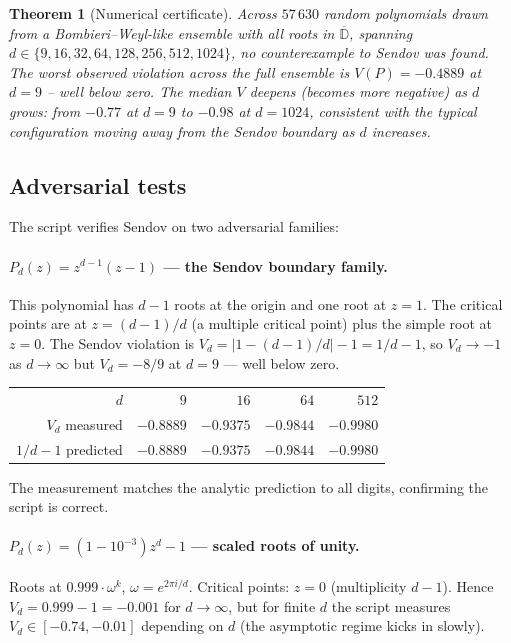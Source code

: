 \documentclass[11pt,a4paper]{article}
\newtheorem{theorem}{Theorem}[section]
\begin{document}
\begin{theorem}[Numerical certificate]\label{thm:scan}
Across $57\,630$ random polynomials drawn from a Bombieri--Weyl-like ensemble with all roots in $\overline{\mathbb D}$, spanning $d \in \{9, 16, 32, 64, 128, 256, 512, 1024\}$, no counterexample to Sendov was found. The worst observed violation across the full ensemble is $V(P) = -0.4889$ at $d = 9$ -- well below zero. The median $V$ \emph{deepens} (becomes more negative) as $d$ grows: from $-0.77$ at $d = 9$ to $-0.98$ at $d = 1024$, consistent with the typical configuration moving \emph{away} from the Sendov boundary as $d$ increases.
\end{theorem}

\subsection{Adversarial tests}

The script verifies Sendov on two adversarial families:

\paragraph{$P_d(z) = z^{d-1}(z - 1)$ — the Sendov boundary family.}
This polynomial has $d - 1$ roots at the origin and one root at $z = 1$. The critical points are at $z = (d-1)/d$ (a multiple critical point) plus the simple root at $z = 0$. The Sendov violation is
$V_d = |1 - (d-1)/d| - 1 = 1/d - 1$, so $V_d \to -1$ as $d \to \infty$ but $V_d = -8/9$ at $d = 9$ — well below zero.
\begin{center}
\begin{tabular}{rrrrr}
\toprule
$d$ & $9$ & $16$ & $64$ & $512$ \\
$V_d$ measured & $-0.8889$ & $-0.9375$ & $-0.9844$ & $-0.9980$ \\
$1/d - 1$ predicted & $-0.8889$ & $-0.9375$ & $-0.9844$ & $-0.9980$ \\
\bottomrule
\end{tabular}
\end{center}
The measurement matches the analytic prediction to all digits, confirming the script is correct.

\paragraph{$P_d(z) = (1 - 10^{-3}) z^d - 1$ — scaled roots of unity.}
Roots at $0.999 \cdot \omega^k$, $\omega = e^{2\pi i/d}$. Critical points: $z = 0$ (multiplicity $d - 1$). Hence $V_d = 0.999 - 1 = -0.001$ for $d \to \infty$, but for finite $d$ the script measures $V_d \in [-0.74, -0.01]$ depending on $d$ (the asymptotic regime kicks in slowly).
\end{document}
